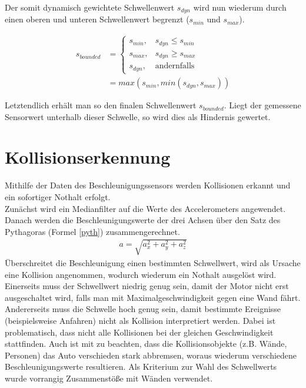 \documentclass[a4paper,12pt]{report}
\begin{document}
	Der somit dynamisch gewichtete Schwellenwert $s_{dyn}$ wird nun wiederum durch einen oberen und unteren Schwellenwert begrenzt ($s_{min}$ und $s_{max}$).

	\begin{align*}
		s_{bounded} &=
		\begin{cases}
		s_{min},										& s_{dyn} \leq s_{min} \\
		s_{max},										& s_{dyn} \geq s_{max} \\
		s_{dyn}, 										& \text{andernfalls}
		\end{cases}
		\\
		&= max(s_{min}, min(s_{dyn}, s_{max}))
	\end{align*}

	Letztendlich erhält man so den finalen Schwellenwert $s_{bounded}$.
	Liegt der gemessene Sensorwert unterhalb dieser Schwelle, so wird dies als Hindernis gewertet.

\chapter{Kollisionserkennung}


	Mithilfe der Daten des Beschleunigungssensors werden Kollisionen erkannt und ein sofortiger Nothalt erfolgt.\\
Zunächst wird ein Medianfilter auf die Werte des Accelerometers angewendet. Danach werden die Beschleunigungswerte der drei Achsen über den Satz des Pythagoras (Formel \ref{pyth}) zusammengerechnet.
\begin{align}
	a = \sqrt{a_{x}^2+a_{y}^2+a_{z}^2}
	\label{pyth}
\end{align}
Überschreitet die Beschleunigung einen bestimmten Schwellwert, wird als Ursache eine Kollision angenommen, wodurch wiederum ein Nothalt ausgelöst wird.\\
Einerseits muss der Schwellwert niedrig genug sein, damit der Motor nicht erst ausgeschaltet wird, falls man mit Maximalgeschwindigkeit gegen eine Wand fährt. Andererseits muss die Schwelle hoch genug sein, damit bestimmte Ereignisse (beispielsweise Anfahren) nicht als Kollision interpretiert werden. Dabei ist problematisch, dass nicht alle Kollisionen bei der gleichen Geschwindigkeit stattfinden. Auch ist mit zu beachten, dass die Kollisionsobjekte (z.B. Wände, Personen) das Auto verschieden stark abbremsen, woraus wiederum verschiedene Beschleunigungswerte resultieren. Als Kriterium zur Wahl des Schwellwerts wurde vorrangig Zusammenstöße mit Wänden verwendet.
\end{document}
